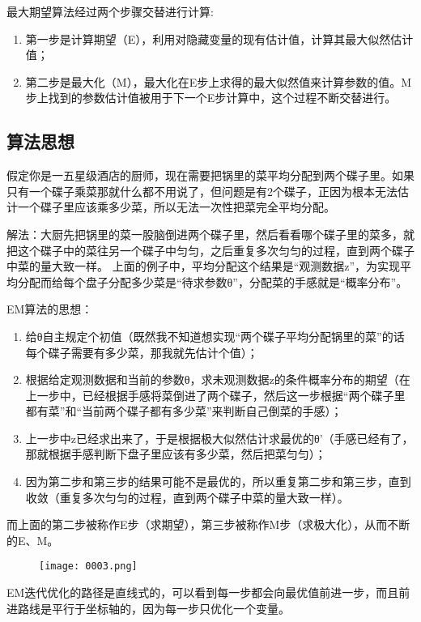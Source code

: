 \documentclass[12pt]{article}
\begin{document}
最大期望算法经过两个步骤交替进行计算:
\begin{enumerate}
	\item 第一步是计算期望（E），利用对隐藏变量的现有估计值，计算其最大似然估计值；
	\item 第二步是最大化（M），最大化在E步上求得的最大似然值来计算参数的值。M步上找到的参数估计值被用于下一个E步计算中，这个过程不断交替进行。
\end{enumerate}

\subsection{算法思想}
假定你是一五星级酒店的厨师，现在需要把锅里的菜平均分配到两个碟子里。如果只有一个碟子乘菜那就什么都不用说了，但问题是有2个碟子，正因为根本无法估计一个碟子里应该乘多少菜，所以无法一次性把菜完全平均分配。

解法：大厨先把锅里的菜一股脑倒进两个碟子里，然后看看哪个碟子里的菜多，就把这个碟子中的菜往另一个碟子中匀匀，之后重复多次匀匀的过程，直到两个碟子中菜的量大致一样。 上面的例子中，平均分配这个结果是“观测数据z”，为实现平均分配而给每个盘子分配多少菜是“待求参数θ”，分配菜的手感就是“概率分布”。

EM算法的思想：
\begin{enumerate}
	\item 给θ自主规定个初值（既然我不知道想实现“两个碟子平均分配锅里的菜”的话每个碟子需要有多少菜，那我就先估计个值）；
	\item 根据给定观测数据和当前的参数θ，求未观测数据z的条件概率分布的期望（在上一步中，已经根据手感将菜倒进了两个碟子，然后这一步根据“两个碟子里都有菜”和“当前两个碟子都有多少菜”来判断自己倒菜的手感）；
	\item 上一步中z已经求出来了，于是根据极大似然估计求最优的θ’（手感已经有了，那就根据手感判断下盘子里应该有多少菜，然后把菜匀匀）；
	\item 因为第二步和第三步的结果可能不是最优的，所以重复第二步和第三步，直到收敛（重复多次匀匀的过程，直到两个碟子中菜的量大致一样）。
\end{enumerate}
而上面的第二步被称作E步（求期望），第三步被称作M步（求极大化），从而不断的E、M。

\begin{figure}[htbp]
	\centering
	\texttt{[image: 0003.png]}
\end{figure}

EM迭代优化的路径是直线式的，可以看到每一步都会向最优值前进一步，而且前进路线是平行于坐标轴的，因为每一步只优化一个变量。
\end{document}
